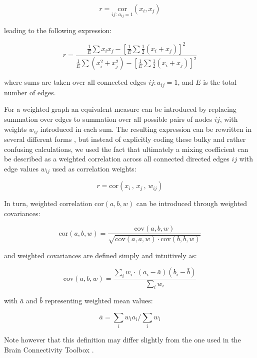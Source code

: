 \documentclass{article}
\begin{document}
\[ r=\underset{ij: \, a_{ij}=1}{\text{cor}}(x_i,x_j) \]

leading to the following expression:

\[ r = \frac{\frac{1}{E} \sum{x_i x_j} - [\frac{1}{E} \sum{\frac{1}{2}(x_i+x_j)}]^2} {\frac{1}{E} \sum{(x_i^2+x_j^2)}-[\frac{1}{E} \sum{\frac{1}{2}(x_i+x_j)}]^2} \]

where sums are taken over all connected edges $ij: a_{ij}=1$, and $E$ is the total number of edges.

For a weighted graph an equivalent measure can be introduced by replacing summation over edges to summation over all possible pairs of nodes $ij$, with weights $w_{ij}$ introduced in each sum. The resulting expression can be rewritten in several different forms \citep{newman2003mixing,leung2007weighted,farine2014weighted,teller2014assortative}, but instead of explicitly coding these bulky and rather confusing calculations, we used the fact that ultimately a mixing coefficient can be described as a weighted correlation across all connected directed edges $ij$ with edge values $w_{ij}$ used as correlation weights:

\[ r=\text{cor}(x_i \, , \, x_j \, , \, w_{ij}) \]

In turn, weighted correlation $\text{cor}(a,b,w)$ can be introduced through weighted covariances: 

\[ \text{cor}(a,b,w) = \frac{\text{cov}(a,b,w)}{\sqrt{\text{cov}(a,a,w) \cdot \text{cov}(b,b,w)}} \]

and weighted covariances are defined simply and intuitively as: 

\[ \text{cov}(a,b,w) = \frac{\sum_i{w_i \cdot (a_i-\bar{a})(b_i-\bar{b})}}{\sum_i{w_i}} \]

with $\bar{a}$ and $\bar{b}$ representing weighted mean values: 

\[ \bar{a}=\sum_i{w_i a_i}/\sum_i{w_i} \]

Note however that this definition may differ slightly from the one used in the Brain Connectivity Toolbox \citep{rubinov2010toolbox}.
\end{document}
